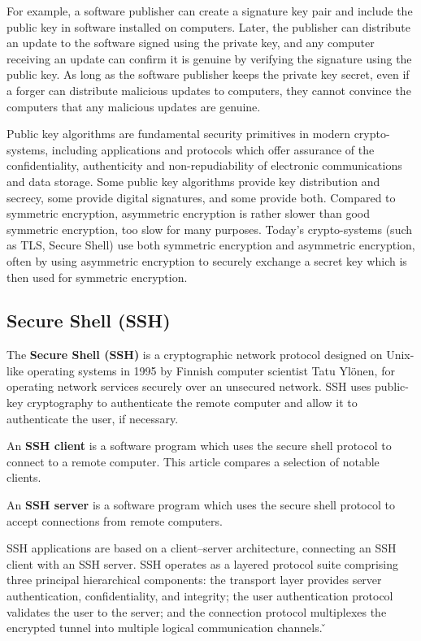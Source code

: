 \be
For example, a software publisher can create a signature key pair and include the public key in software installed on
computers. Later, the publisher can distribute an update to the software signed using the private key, and any
computer receiving an update can confirm it is genuine by verifying the signature using the public key. As long as
the software publisher keeps the private key secret, even if a forger can distribute malicious updates to computers,
they cannot convince the computers that any malicious updates are genuine.
\ee

Public key algorithms are fundamental security primitives in modern crypto-systems, including applications and
protocols which offer assurance of the confidentiality, authenticity and non-repudiability of electronic
communications and data storage.  Some public key algorithms provide key distribution and secrecy, some provide
digital signatures, and some provide both. Compared to symmetric encryption, asymmetric encryption is rather slower
than good symmetric encryption, too slow for many purposes. Today's crypto-systems (such as TLS, Secure Shell) use
both symmetric encryption and asymmetric encryption, often by using asymmetric encryption to securely exchange a
secret key which is then used for symmetric encryption.

\subsection{Secure Shell (SSH)}

The \textbf{Secure Shell (SSH)} is a cryptographic network protocol designed on Unix-like operating systems in 1995
by Finnish computer scientist Tatu Ylönen, for operating network services securely over an unsecured network. SSH uses
public-key cryptography to authenticate the remote computer and allow it to authenticate the user, if necessary.
\ed

An \textbf{SSH client} is a software program which uses the secure shell protocol to connect to a remote computer. This
article compares a selection of notable clients.
\ed

An \textbf{SSH server} is a software program which uses the secure shell protocol to accept connections from remote
computers.
\ed

SSH applications are based on a client–server architecture, connecting an SSH client with an SSH server. SSH operates
as a layered protocol suite comprising three principal hierarchical components: the transport layer provides server
authentication, confidentiality, and integrity; the user authentication protocol validates the user to the server;
and the connection protocol multiplexes the encrypted tunnel into multiple logical communication channels. \v


